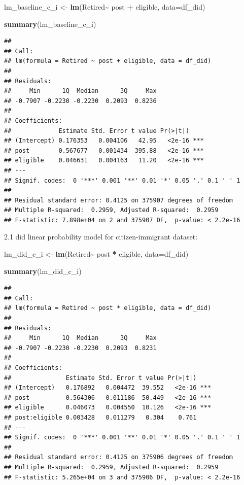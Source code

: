\documentclass[
]{article}
\newenvironment{Shaded}{\begin{snugshade}}{\end{snugshade}}
\newcommand{\AttributeTok}[1]{\textcolor[rgb]{0.13,0.29,0.53}{#1}}
\newcommand{\FunctionTok}[1]{\textcolor[rgb]{0.13,0.29,0.53}{\textbf{#1}}}
\newcommand{\NormalTok}[1]{#1}
\newcommand{\OtherTok}[1]{\textcolor[rgb]{0.56,0.35,0.01}{#1}}
\newcommand{\SpecialCharTok}[1]{\textcolor[rgb]{0.81,0.36,0.00}{\textbf{#1}}}
\begin{document}
\begin{Shaded}
\begin{Highlighting}[]
\NormalTok{lm\_baseline\_c\_i }\OtherTok{\textless{}{-}} \FunctionTok{lm}\NormalTok{(Retired}\SpecialCharTok{\textasciitilde{}}\NormalTok{ post }\SpecialCharTok{+}\NormalTok{ eligible, }\AttributeTok{data=}\NormalTok{df\_did)}

\FunctionTok{summary}\NormalTok{(lm\_baseline\_c\_i)}
\end{Highlighting}
\end{Shaded}

\begin{verbatim}
## 
## Call:
## lm(formula = Retired ~ post + eligible, data = df_did)
## 
## Residuals:
##     Min      1Q  Median      3Q     Max 
## -0.7907 -0.2230 -0.2230  0.2093  0.8236 
## 
## Coefficients:
##             Estimate Std. Error t value Pr(>|t|)    
## (Intercept) 0.176353   0.004106   42.95   <2e-16 ***
## post        0.567677   0.001434  395.88   <2e-16 ***
## eligible    0.046631   0.004163   11.20   <2e-16 ***
## ---
## Signif. codes:  0 '***' 0.001 '**' 0.01 '*' 0.05 '.' 0.1 ' ' 1
## 
## Residual standard error: 0.4125 on 375907 degrees of freedom
## Multiple R-squared:  0.2959, Adjusted R-squared:  0.2959 
## F-statistic: 7.898e+04 on 2 and 375907 DF,  p-value: < 2.2e-16
\end{verbatim}

2.1 did linear probability model for citizen-immigrant dataset:

\begin{Shaded}
\begin{Highlighting}[]
\NormalTok{lm\_did\_c\_i }\OtherTok{\textless{}{-}} \FunctionTok{lm}\NormalTok{(Retired}\SpecialCharTok{\textasciitilde{}}\NormalTok{ post }\SpecialCharTok{*}\NormalTok{ eligible, }\AttributeTok{data=}\NormalTok{df\_did)}

\FunctionTok{summary}\NormalTok{(lm\_did\_c\_i)}
\end{Highlighting}
\end{Shaded}

\begin{verbatim}
## 
## Call:
## lm(formula = Retired ~ post * eligible, data = df_did)
## 
## Residuals:
##     Min      1Q  Median      3Q     Max 
## -0.7907 -0.2230 -0.2230  0.2093  0.8231 
## 
## Coefficients:
##               Estimate Std. Error t value Pr(>|t|)    
## (Intercept)   0.176892   0.004472  39.552   <2e-16 ***
## post          0.564306   0.011186  50.449   <2e-16 ***
## eligible      0.046073   0.004550  10.126   <2e-16 ***
## post:eligible 0.003428   0.011279   0.304    0.761    
## ---
## Signif. codes:  0 '***' 0.001 '**' 0.01 '*' 0.05 '.' 0.1 ' ' 1
## 
## Residual standard error: 0.4125 on 375906 degrees of freedom
## Multiple R-squared:  0.2959, Adjusted R-squared:  0.2959 
## F-statistic: 5.265e+04 on 3 and 375906 DF,  p-value: < 2.2e-16
\end{verbatim}
\end{document}
